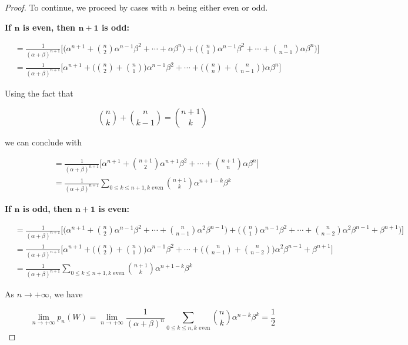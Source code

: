 \documentclass[10pt, oneside]{article}
\begin{document}
\begin{enumerate}[label=3.\arabic*]
\begin{proof}
To continue, we proceed by cases with $n$ being either even or odd.

\textbf{If $\bm{n}$ is even, then $\bm{n+1}$ is odd:}

\begin{align*}
&= \frac{1}{(\alpha + \beta)^{n+1}} \bigg[ \bigg( \alpha^{n+1} + \binom{n}{2} \alpha^{n-1} \beta^2 + \cdots + \alpha \beta^n \bigg) + \bigg( \binom{n}{1} \alpha^{n-1} \beta^2 + \cdots + \binom{n}{n-1} \alpha \beta^n \bigg) \bigg] \\
&= \frac{1}{(\alpha + \beta)^{n+1}} \bigg[ \alpha^{n+1} + \bigg( \binom{n}{2} + \binom{n}{1} \bigg) \alpha^{n-1} \beta^2 + \cdots + \bigg( \binom{n}{n} + \binom{n}{n-1} \bigg) \alpha \beta^n \bigg]
\end{align*}

Using the fact that

\[ \binom{n}{k} + \binom{n}{k-1} = \binom{n+1}{k} \]

we can conclude with

\begin{align*}
&= \frac{1}{(\alpha + \beta)^{n+1}} \bigg[ \alpha^{n+1} + \binom{n+1}{2} \alpha^{n+1} \beta^2 + \cdots + \binom{n+1}{n} 
\alpha \beta^n \bigg] \\
&= \boxed{ \frac{1}{(\alpha + \beta)^{n+1}} \sum_{0 \leq k \leq n+1, k \text{ even}} \binom{n+1}{k} \alpha^{n+1-k} \beta^k }
\end{align*}

\textbf{If $\bm{n}$ is odd, then $\bm{n+1}$ is even:}

\begin{align*}
&= \frac{1}{(\alpha + \beta)^{n+1}} \bigg[ \bigg( \alpha^{n+1} + \binom{n}{2} \alpha^{n-1} \beta^2 + \cdots + \binom{n}{n-1} \alpha^2 \beta^{n-1} \bigg) + \bigg( \binom{n}{1} \alpha^{n-1} \beta^2 + \cdots + \binom{n}{n-2} \alpha^2 \beta^{n-1} + \beta^{n+1} \bigg) \bigg] \\
&= \frac{1}{(\alpha + \beta)^{n+1}} \bigg[ \alpha^{n+1} + \bigg( \binom{n}{2} + \binom{n}{1} \bigg) \alpha^{n-1} \beta^2 + \cdots + \bigg( \binom{n}{n-1} + \binom{n}{n-2} \bigg) \alpha^2 \beta^{n-1} + \beta^{n+1} \bigg] \\
&= \boxed{ \frac{1}{(\alpha + \beta)^{n+1}} \sum_{0 \leq k \leq n + 1, k \text{ even}} \binom{n+1}{k} \alpha^{n+1-k} \beta^k }
\end{align*}

As $n \rightarrow + \infty$, we have

\[ \lim_{n \rightarrow + \infty} p_n (W) = \lim_{n \rightarrow +\infty} \frac{1}{(\alpha + \beta)^n} \sum_{0 \leq k \leq n, k \text{ even}} \binom{n}{k} \alpha^{n - k} \beta^k = \boxed{\frac{1}{2}} \]


\end{proof}
\end{enumerate}
\end{document}

